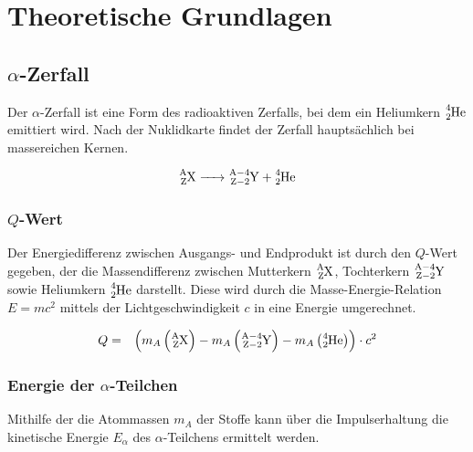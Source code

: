 \documentclass[12pt,a4paper]{scrartcl}
\numberwithin{equation}{section} %
\begin{document}
\hypertarget{theoretische-grundlagen}{%
\section{Theoretische Grundlagen}\label{theoretische-grundlagen}}

\hypertarget{alpha-zerfall}{%
\subsection{\texorpdfstring{$\alpha$-Zerfall}{\textbackslash alpha-Zerfall}}\label{alpha-zerfall}}

Der $\alpha$-Zerfall ist eine Form des radioaktiven Zerfalls, bei dem ein Heliumkern $\ce{^4_2He}$ emittiert wird. Nach der Nuklidkarte findet der Zerfall hauptsächlich bei massereichen Kernen. \cite{Chart of Nuclides}

\begin{eqnarray}
    \ce{^A_ZX -> ^{A-4}_{Z-2}Y + ^4_2He}
\end{eqnarray}

\hypertarget{q-wert}{%
\subsubsection{\texorpdfstring{$Q$-Wert}{Q-Wert}}\label{q-wert}}

Der Energiedifferenz zwischen Ausgangs- und Endprodukt ist durch den $Q$-Wert gegeben, der die Massendifferenz zwischen Mutterkern $\ce{^A_ZX}$, Tochterkern $\ce{^{A-4}_{Z-2}Y}$ sowie Heliumkern $\ce{^4_2He}$ darstellt. Diese wird durch die Masse-Energie-Relation $E=mc^2$ mittels der Lichtgeschwindigkeit $c$ in eine Energie umgerechnet.

\begin{eqnarray}
    Q &=&
        \left(m_{A}
            \left(\ce{^A_ZX}\right)
            - m_{A}\left(\ce{^{A-4}_{Z-2}Y}\right)
            - m_{A}\left(\ce{^4_2He}\right)
        \right) \cdot c^2
\end{eqnarray}

\hypertarget{energie-der-alpha-teilchen}{%
\subsubsection{\texorpdfstring{Energie der
$\alpha$-Teilchen}{Energie der \textbackslash alpha-Teilchen}}\label{energie-der-alpha-teilchen}}

Mithilfe der die Atommassen $m_{A}$ der Stoffe kann über die Impulserhaltung die kinetische Energie $E_\alpha$ des $\alpha$-Teilchens ermittelt werden.
\end{document}
